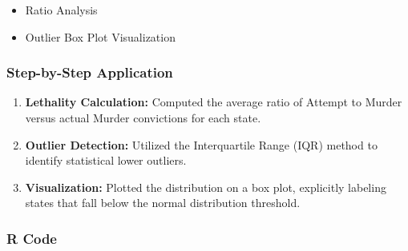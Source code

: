 \documentclass[
]{article}
\providecommand{\tightlist}{%
  \setlength{\itemsep}{0pt}\setlength{\parskip}{0pt}}
\begin{document}
\begin{itemize}
\tightlist
\item
  Ratio Analysis
\item
  Outlier Box Plot Visualization
\end{itemize}

\subsubsection{Step-by-Step
Application}\label{step-by-step-application-2}

\begin{enumerate}
\def\labelenumi{\arabic{enumi}.}
\tightlist
\item
  \textbf{Lethality Calculation:} Computed the average ratio of Attempt
  to Murder versus actual Murder convictions for each state.
\item
  \textbf{Outlier Detection:} Utilized the Interquartile Range (IQR)
  method to identify statistical lower outliers.
\item
  \textbf{Visualization:} Plotted the distribution on a box plot,
  explicitly labeling states that fall below the normal distribution
  threshold.
\end{enumerate}

\subsubsection{R Code}\label{r-code-2}
\end{document}
